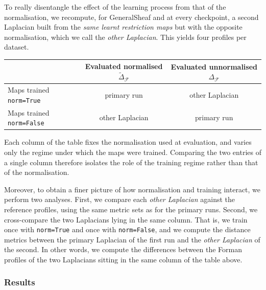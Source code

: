 To really disentangle the effect of the learning process from that of the
normalisation, we recompute, for GeneralSheaf and at every
checkpoint, a second Laplacian built from the \emph{same learnt restriction
maps} but with the opposite normalisation, which we call the \emph{other
Laplacian}. This yields four profiles per dataset.
\begin{center}
\renewcommand{\arraystretch}{1.3}
\begin{tabular}{lcc}
\toprule
 & \textbf{Evaluated normalised} $\widetilde{\Delta}_{\mathcal{F}}$
 & \textbf{Evaluated unnormalised} $\Delta_{\mathcal{F}}$ \\
\midrule
Maps trained \texttt{norm=True}  & primary run    & other Laplacian \\
Maps trained \texttt{norm=False} & other Laplacian & primary run     \\
\bottomrule
\end{tabular}
\end{center}

Each column of the table fixes the normalisation used at evaluation, and varies
only the regime under which the maps were trained. Comparing the two entries of
a single column therefore isolates the role of the training regime rather than
that of the normalisation.

Moreover, to obtain a finer picture of how normalisation and training interact,
we perform two analyses. First, we compare each \emph{other Laplacian} against
the reference profiles, using the same metric sets as for the primary runs.
Second, we cross-compare the two Laplacians lying in the same column. That is,
we train once with \texttt{norm=True} and once with \texttt{norm=False}, and we
compute the distance metrics between the primary Laplacian of the first run and
the \emph{other Laplacian} of the second. In other words, we compute the
differences between the Forman profiles of the two Laplacians sitting in the
same column of the table above.


\subsubsection{Results}
